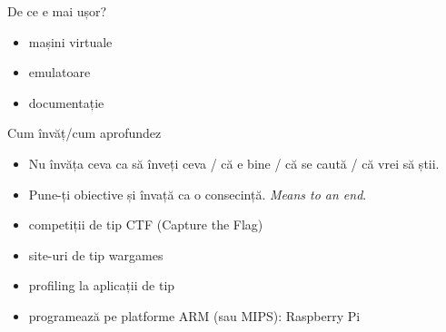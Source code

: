 \documentclass{beamer}
\begin{document}

\begin{frame}{De ce e mai ușor?}
  \begin{itemize}
    \item mașini virtuale
    \item emulatoare
    \item documentație
  \end{itemize}
\end{frame}

\begin{frame}{Cum învăț/cum aprofundez}
  \begin{itemize}
    \pause \item Nu învăța ceva ca să înveți ceva / că e bine / că se caută / că vrei să știi.
    \pause \item Pune-ți obiective și învață ca o consecință. \textit{Means to an end}.
    \item competiții de tip CTF (Capture the Flag)
    \item site-uri de tip wargames
    \item profiling la aplicații de tip
    \item programează pe platforme ARM (sau MIPS): Raspberry Pi
  \end{itemize}
\end{frame}
\end{document}
